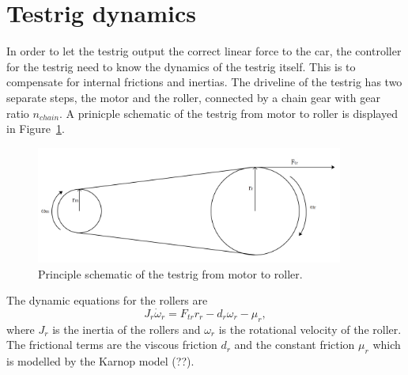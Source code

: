 \section{Testrig dynamics}
In order to let the testrig output the correct linear force to the car, the
controller for the testrig need to know the dynamics of the testrig itself. This
is to compensate for internal frictions and inertias. The driveline of the
testrig has two separate steps, the motor and the roller, connected by a chain
gear with gear ratio $n_{chain}$. A prinicple schematic of the testrig from
motor to roller is displayed in Figure~\ref{fig:testrig_testrigdynamics}.
\begin{figure}[H]
    \label{fig:testrig_testrigdynamics}
    \centering
    \includegraphics[width=0.9\textwidth]{./img/testrig_rollerschematic.png}
    \caption{Principle schematic of the testrig from motor to roller.}
\end{figure}
The dynamic equations for the rollers are
\begin{equation} \label{eq:testrig_rollerdynamics}
    J_r \dot{\omega}_r = F_{tr}r_r - d_r \omega_r - \mu_r,
\end{equation}
where $J_r$ is the inertia of the rollers and $\omega_r$ is the rotational velocity
of the roller. The frictional terms are the viscous friction $d_r$ and the
constant friction $\mu_r$ which is modelled by the Karnop model (??).

